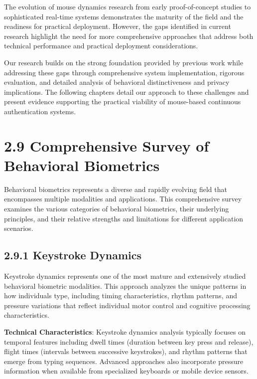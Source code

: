 \documentclass[
  12pt,
  a4paper,
]{report}
\begin{document}
The evolution of mouse dynamics research from early proof-of-concept
studies to sophisticated real-time systems demonstrates the maturity of
the field and the readiness for practical deployment. However, the gaps
identified in current research highlight the need for more comprehensive
approaches that address both technical performance and practical
deployment considerations.

Our research builds on the strong foundation provided by previous work
while addressing these gaps through comprehensive system implementation,
rigorous evaluation, and detailed analysis of behavioral distinctiveness
and privacy implications. The following chapters detail our approach to
these challenges and present evidence supporting the practical viability
of mouse-based continuous authentication systems.

\newpage

\section{2.9 Comprehensive Survey of Behavioral
Biometrics}\label{comprehensive-survey-of-behavioral-biometrics}

Behavioral biometrics represents a diverse and rapidly evolving field
that encompasses multiple modalities and applications. This
comprehensive survey examines the various categories of behavioral
biometrics, their underlying principles, and their relative strengths
and limitations for different application scenarios.

\subsection{2.9.1 Keystroke Dynamics}\label{keystroke-dynamics}

Keystroke dynamics represents one of the most mature and extensively
studied behavioral biometric modalities. This approach analyzes the
unique patterns in how individuals type, including timing
characteristics, rhythm patterns, and pressure variations that reflect
individual motor control and cognitive processing characteristics.

\textbf{Technical Characteristics}: Keystroke dynamics analysis
typically focuses on temporal features including dwell times (duration
between key press and release), flight times (intervals between
successive keystrokes), and rhythm patterns that emerge from typing
sequences. Advanced approaches also incorporate pressure information
when available from specialized keyboards or mobile device sensors.
\end{document}
